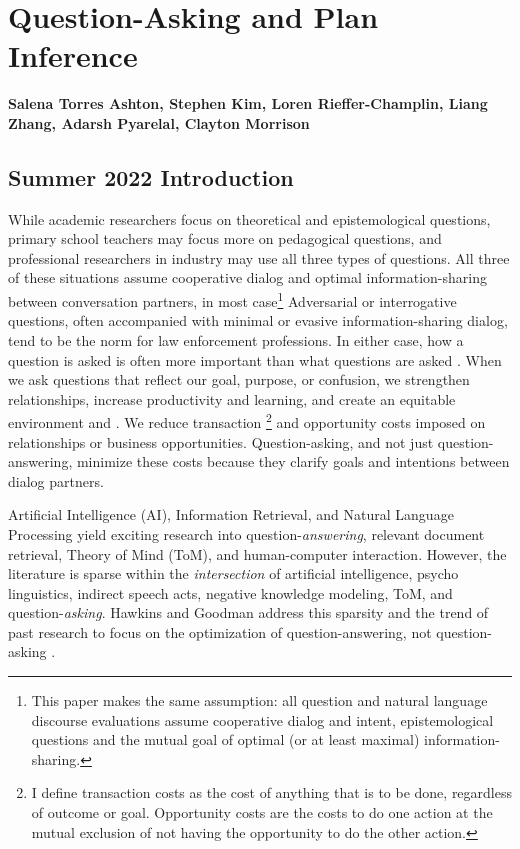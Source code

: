 \chapter{Question-Asking and Plan Inference}
\label{ch:question_plan}
\textbf{Salena Torres Ashton, Stephen Kim, Loren Rieffer-Champlin, Liang Zhang,
Adarsh Pyarelal, Clayton Morrison}


\section{Summer 2022 Introduction}

While academic researchers focus on theoretical and epistemological questions, primary school teachers may focus more on pedagogical questions, and professional researchers in industry may use all three types of questions. All three of these situations assume cooperative dialog and optimal information-sharing between conversation partners, in most case\footnote{This paper makes the same assumption: all question and natural language discourse evaluations assume cooperative dialog and intent, epistemological questions and the mutual goal of optimal (or at least maximal) information-sharing.} Adversarial or interrogative questions, often accompanied with minimal or evasive information-sharing dialog, tend to be the norm for law enforcement professions. In either case, how a question is asked is often more important than what questions are asked \citet{ray_2001}. When we ask questions that reflect our goal, purpose, or confusion,  we strengthen relationships, increase productivity and learning, and create an equitable environment \citet{rothe_lake_gureckis_2018} and \citet{alaimi_2020}. We reduce transaction \footnote{I define transaction costs as the cost of anything that is to be done, regardless of outcome or goal. Opportunity costs are the costs to do one action at the mutual exclusion of not having the opportunity to do the other action.} and opportunity costs imposed on relationships or business opportunities. Question-asking, and not just question-answering, minimize these costs because they clarify goals and intentions between dialog partners.

Artificial Intelligence (AI), Information Retrieval, and Natural Language Processing yield exciting research into question-\emph{answering}, relevant document retrieval, Theory of Mind (ToM), and human-computer interaction. However, the literature is sparse within the  \emph{intersection} of artificial intelligence, psycho linguistics, indirect speech acts, negative knowledge modeling, ToM, and question-\emph{asking}. Hawkins and Goodman address this sparsity and the trend of past research to focus on the optimization of question-answering, not question-asking \citet{hawkins_goodman_2017}. 

